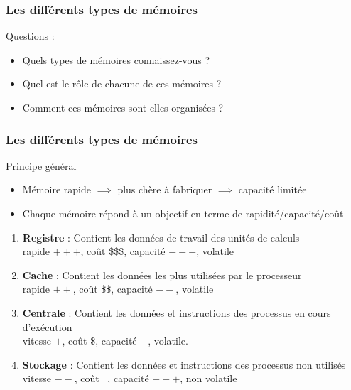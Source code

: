 \documentclass[8pt]{beamer}
\begin{document}
\begin{frame}
    \frametitle{Les différents types de mémoires}
    \begin{alertblock}{Questions :}
        \begin{itemize}
            \item Quels types de m\'emoires connaissez-vous ?
            \item Quel est le r\^ole de chacune de ces m\'emoires ?
            \item Comment ces m\'emoires sont-elles organis\'ees ?
        \end{itemize}
    \end{alertblock}
\end{frame}

\begin{frame}
    \frametitle{Les différents types de mémoires}
    \begin{block}{Principe général}
        \begin{itemize}
            \item M\'emoire rapide $\implies$ plus  ch\`ere \`a
                  fabriquer $\implies$ capacité  limit\'ee
            \item Chaque m\'emoire r\'epond \`a un objectif en
                  terme de rapidit\'e/capacité/co\^ut
        \end{itemize}
    \end{block}
    \begin{enumerate}
        \item \textbf{Registre} : Contient les données de travail des unités de
              calculs \\
              rapide $+++$, coût \$\$\$, capacité $---$, volatile
        \item \textbf{Cache} : Contient les données  les
              plus utilisées par le processeur \\
              rapide $++$, coût \$\$, capacité $--$, volatile
        \item \textbf{Centrale} : Contient les données et instructions des
              processus en cours d'exécution \\
              vitesse $+$, coût \$, capacité $+$, volatile.
        \item \textbf{Stockage} : Contient les données et instructions des
              processus non utilisés \\
              vitesse $--$, coût \textcent~, capacité
              $+++$,
              non
              volatile
              \\
    \end{enumerate}

\end{frame}
\end{document}
